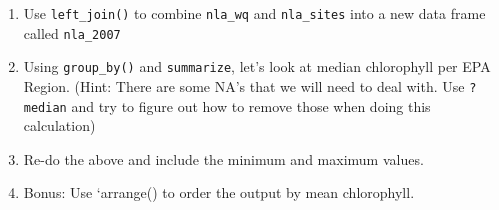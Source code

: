 \documentclass[]{article}
\providecommand{\tightlist}{%
  \setlength{\itemsep}{0pt}\setlength{\parskip}{0pt}}
\begin{document}
\begin{enumerate}
\def\labelenumi{\arabic{enumi}.}
\tightlist
\item
  Use \texttt{left\_join()} to combine \texttt{nla\_wq} and
  \texttt{nla\_sites} into a new data frame called \texttt{nla\_2007}
\item
  Using \texttt{group\_by()} and \texttt{summarize}, let's look at
  median chlorophyll per EPA Region. (Hint: There are some NA's that we
  will need to deal with. Use \texttt{?median} and try to figure out how
  to remove those when doing this calculation)
\item
  Re-do the above and include the minimum and maximum values.
\item
  Bonus: Use `arrange() to order the output by mean chlorophyll.
\end{enumerate}
\end{document}
